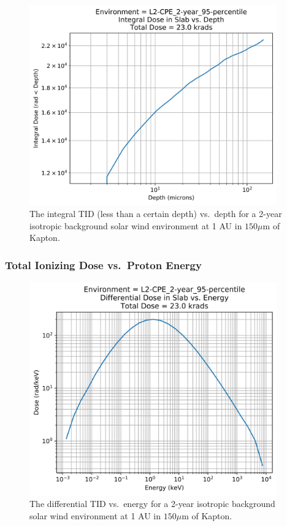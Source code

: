 \documentclass{hitec}
\begin{document}
\begin{figure}[htbp!]
	\centering
	\includegraphics[width=0.95\textwidth]{../L2-CPE_2-year_95-percentile_Integral_Dose_vs_Depth.png}
	\caption{The integral TID (less than a certain depth) vs.\ depth for a 2-year isotropic background solar wind environment at 1 AU in $150 \mu$m of Kapton.}\label{fig:L2-CPE_2-year_95-percentile_Integral_Dose_vs_Depth}
\end{figure}

\clearpage %


\subsubsection{Total Ionizing Dose vs.\ Proton Energy}
\label{sssec:TID-LowE-Dose vs Energy}

\begin{figure}[htbp!]
	\centering
	\includegraphics[width=0.95\textwidth]{../L2-CPE_2-year_95-percentile_Differential_Dose_vs_Energy.png}
	\caption{The differential TID vs.\ energy for a 2-year isotropic background solar wind environment at 1 AU in $150 \mu$m of Kapton.}\label{fig:L2-CPE_2-year_95-percentile_Differential_Dose_vs_Energy}
\end{figure}
\end{document}
